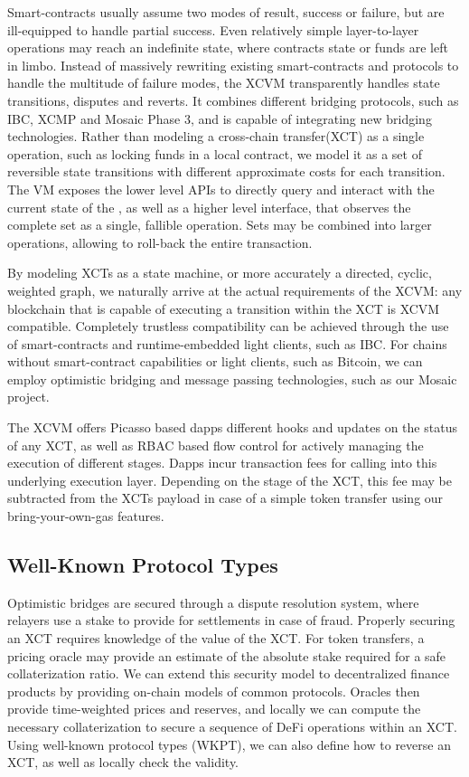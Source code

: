Smart-contracts usually assume two modes of result, success or failure, but are ill-equipped to handle partial success. Even relatively simple layer-to-layer operations may reach an indefinite state, where contracts state or funds are left in limbo. Instead of massively rewriting existing smart-contracts and protocols to handle the multitude of failure modes, the XCVM transparently handles state transitions, disputes and reverts. It combines different bridging protocols, such as IBC, XCMP and Mosaic Phase 3, and is capable of integrating new bridging technologies. Rather than modeling a cross-chain transfer(XCT) as a single operation, such as locking funds in a local contract, we model it as a set of reversible state transitions with different approximate costs for each transition. The VM exposes the lower level APIs to directly query and interact with the current state of the , as well as a higher level interface, that observes the complete set as a single, fallible operation. Sets may be combined into larger operations, allowing to roll-back the entire transaction.

By modeling XCTs as a state machine, or more accurately a directed, cyclic, weighted graph, we naturally arrive at the actual requirements of the XCVM: any blockchain that is capable of executing a transition within the XCT is XCVM compatible. Completely trustless compatibility can be achieved through the use of smart-contracts and runtime-embedded light clients, such as IBC. For chains without smart-contract capabilities or light clients, such as Bitcoin, we can employ optimistic bridging and message passing technologies, such as our Mosaic project. 

The XCVM offers Picasso based dapps different hooks and updates on the status of any XCT, as well as RBAC based flow control for actively managing the execution of different stages. Dapps incur transaction fees for calling into this underlying execution layer. Depending on the stage of the XCT, this fee may be subtracted from the XCTs payload in case of a simple token transfer using our bring-your-own-gas features.

\subsection{Well-Known Protocol Types}
Optimistic bridges are secured through a dispute resolution system, where relayers use a stake to provide for settlements in case of fraud. Properly securing an XCT requires knowledge of the value of the XCT. For token transfers, a pricing oracle may provide an estimate of the absolute stake required for a safe collaterization ratio. We can extend this security model to decentralized finance products by providing on-chain models of common protocols. Oracles then provide time-weighted prices and reserves, and locally we can compute the necessary collaterization to secure a sequence of DeFi operations within an XCT. Using well-known protocol types (WKPT), we can also define how to reverse an XCT, as well as locally check the validity.

